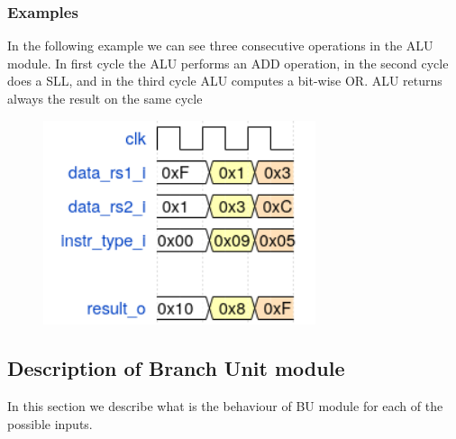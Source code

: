 \subsubsection{Examples}

In the following example we can see three consecutive operations in the ALU module. In first cycle the ALU performs an ADD operation, in the second cycle does a SLL, and in the third cycle ALU computes a bit-wise OR. ALU returns always the result on the same cycle

\begin{figure}[h]
\centering
\includegraphics[width=8cm]{wave_alu.png}
\end{figure}


\subsection{Description of Branch Unit module}

In this section we describe what is the behaviour of BU module for each of the possible inputs.


